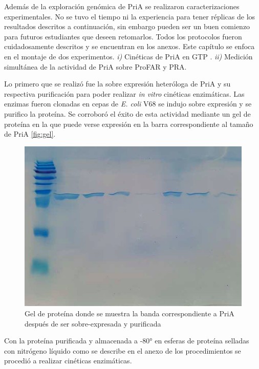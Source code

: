 \documentclass[12pt,twoside]{reedthesis}
\begin{document}
{  Además de la exploración genómica de PriA se realizaron
  caracterizaciones experimentales. No se tuvo el tiempo ni la experiencia
  para tener réplicas de los resultados descritos a continuación, sin
  embargo pueden ser un buen comienzo para futuros estudiantes que deseen
  retomarlos. Todos los protocolos fueron cuidadosamente descritos y se
  encuentran en los anexos. Este capítulo se enfoca en el montaje de dos
  experimentos. \emph{i)} Cinéticas de PriA en GTP . \emph{ii)} Medición
  simultánea de la actividad de PriA sobre ProFAR y PRA.
  
  Lo primero que se realizó fue la sobre expresión heteróloga de PriA y su
  respectiva purificación para poder realizar \emph{in vitro} cinéticas
  enzimáticas. Las enzimas fueron clonadas en cepas de \emph{E. coli} V68
  se indujo sobre expresión y se purifico la proteína. Se corroboró el
  éxito de esta actividad mediante un gel de proteína en la que puede
  verse expresión en la barra correspondiente al tamaño de PriA
  \autoref{fig:gel}.
  
  \begin{figure}[h!tbp]
  \centering
  \includegraphics[angle = 0,scale = 0.6]{chapter4/Geles/PriAAbril30.png}
  \caption[gel]{\footnotesize{Gel de proteína donde se muestra la banda correspondiente a PriA después de ser sobre-expresada y purificada}}
  \label{fig:gel}
  \end{figure}
  
  Con la proteína purificada y almacenada a -80° en esferas de proteína
  selladas con nitrógeno líquido como se describe en el anexo de los
  procedimientos se procedió a realizar cinéticas enzimáticas.
  
}
\end{document}
